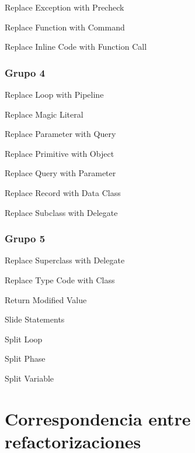 \documentclass[11pt,a4paper,oneside]{book}
\begin{document}
Replace Exception with Precheck

Replace Function with Command

Replace Inline Code with Function Call

\subsection{Grupo 4}
Replace Loop with Pipeline

Replace Magic Literal

Replace Parameter with Query

Replace Primitive with Object

Replace Query with Parameter

Replace Record with Data Class

Replace Subclass with Delegate

\subsection{Grupo 5}
Replace Superclass with Delegate

Replace Type Code with Class

Return Modified Value

Slide Statements

Split Loop

Split Phase

Split Variable



\chapter*{Correspondencia entre refactorizaciones}
\end{document}
